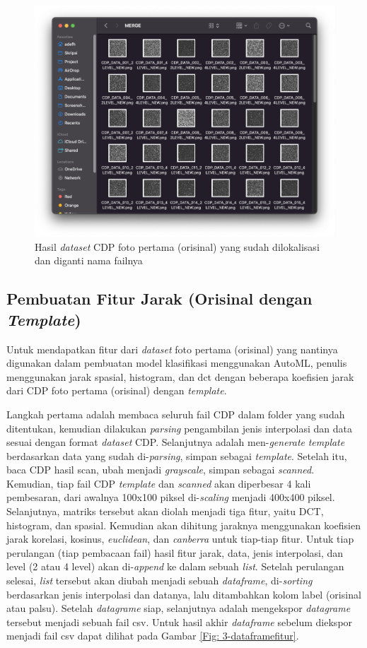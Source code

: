 \begin{figure}[h]
	\centering
	\includegraphics[width=13cm]{contents/chapter-3/3-hasildatasetcdp.png}
	\caption{Hasil \emph{dataset} CDP foto pertama (orisinal) yang sudah dilokalisasi dan diganti nama failnya}
	\label{Fig: 3-hasildatasetcdp}
\end{figure}

\subsection{Pembuatan Fitur Jarak (Orisinal dengan \emph{Template})}
Untuk mendapatkan fitur dari \emph{dataset} foto pertama (orisinal) yang nantinya digunakan dalam pembuatan model klasifikasi menggunakan AutoML, penulis menggunakan jarak spasial, histogram, dan dct dengan beberapa koefisien jarak dari CDP foto pertama (orisinal) dengan \emph{template}.

Langkah pertama adalah membaca seluruh fail CDP dalam folder yang sudah ditentukan, kemudian dilakukan \emph{parsing} pengambilan jenis interpolasi dan data
sesuai dengan format \emph{dataset} CDP. Selanjutnya adalah men-\emph{generate} \emph{template} berdasarkan data yang sudah di-\emph{parsing}, simpan sebagai
\emph{template}. Setelah itu, baca CDP hasil scan, ubah menjadi \emph{grayscale}, simpan sebagai \emph{scanned}. Kemudian, tiap fail CDP \emph{template} dan
\emph{scanned} akan diperbesar 4 kali pembesaran, dari awalnya 100x100 piksel di-\emph{scaling} menjadi 400x400 piksel. Selanjutnya, matriks tersebut akan
diolah menjadi tiga fitur, yaitu DCT, histogram, dan spasial. Kemudian akan dihitung jaraknya menggunakan koefisien jarak korelasi, kosinus, \emph{euclidean},
dan \emph{canberra} untuk tiap-tiap fitur. Untuk tiap perulangan (tiap pembacaan fail) hasil fitur jarak, data, jenis interpolasi, dan level (2 atau 4 level)
akan di-\emph{append} ke dalam sebuah \emph{list}. Setelah perulangan selesai, \emph{list} tersebut akan diubah menjadi sebuah \emph{dataframe},
di-\emph{sorting} berdasarkan jenis interpolasi dan datanya, lalu ditambahkan kolom label (orisinal atau palsu). Setelah \emph{datagrame} siap, selanjutnya
adalah mengekspor \emph{datagrame} tersebut menjadi sebuah fail csv. Untuk hasil akhir \emph{dataframe} sebelum diekspor menjadi fail csv dapat dilihat pada
Gambar \ref{Fig: 3-dataframefitur}.

